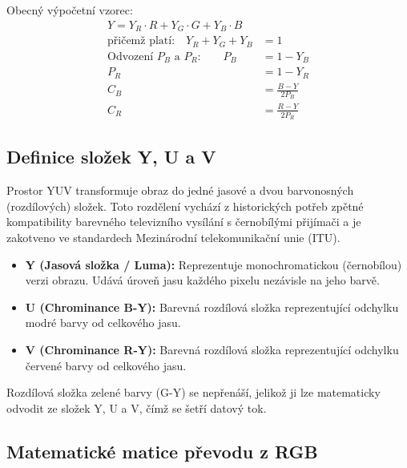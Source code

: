 \documentclass[FM,DP]{tulthesis}
\begin{document}
Obecný výpočetní vzorec:
\begin{equation}
    \begin{aligned}
        Y = Y_R \cdot R + Y_G \cdot G + Y_B \cdot B                                    \\
        \text{přičemž platí:} \quad Y_R + Y_G + Y_B             & = 1                  \\[10pt]
        \text{Odvození } P_B \text{ a } P_R \text{:} \qquad P_B & = 1 - Y_B            \\
        P_R                                                     & = 1 - Y_R            \\[10pt]
        C_B                                                     & = \frac{B - Y}{2P_B} \\
        C_R                                                     & = \frac{R - Y}{2P_R}
    \end{aligned}
\end{equation}

\subsection{Definice složek Y, U a V}

Prostor YUV transformuje obraz do jedné jasové a dvou barvonosných
(rozdílových) složek. Toto rozdělení vychází z historických potřeb zpětné
kompatibility barevného televizního vysílání s černobílými přijímači a je
zakotveno ve standardech Mezinárodní telekomunikační unie (ITU).

\begin{itemize}
    \item \textbf{Y (Jasová složka / Luma):} Reprezentuje monochromatickou (černobílou) verzi obrazu. Udává úroveň jasu každého pixelu nezávisle na jeho barvě.
    \item \textbf{U (Chrominance B-Y):} Barevná rozdílová složka reprezentující odchylku modré barvy od celkového jasu.
    \item \textbf{V (Chrominance R-Y):} Barevná rozdílová složka reprezentující odchylku červené barvy od celkového jasu.
\end{itemize}

Rozdílová složka zelené barvy (G-Y) se nepřenáší, jelikož ji lze matematicky
odvodit ze složek Y, U a V, čímž se šetří datový tok.

\subsection{Matematické matice převodu z RGB}
\end{document}
